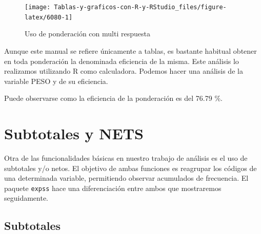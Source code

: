 \documentclass[
]{book}
\newenvironment{Shaded}{\begin{snugshade}}{\end{snugshade}}
\newcommand{\AttributeTok}[1]{\textcolor[rgb]{0.77,0.63,0.00}{#1}}
\newcommand{\ConstantTok}[1]{\textcolor[rgb]{0.00,0.00,0.00}{#1}}
\newcommand{\DecValTok}[1]{\textcolor[rgb]{0.00,0.00,0.81}{#1}}
\newcommand{\FunctionTok}[1]{\textcolor[rgb]{0.00,0.00,0.00}{#1}}
\newcommand{\NormalTok}[1]{#1}
\newcommand{\OtherTok}[1]{\textcolor[rgb]{0.56,0.35,0.01}{#1}}
\newcommand{\SpecialCharTok}[1]{\textcolor[rgb]{0.00,0.00,0.00}{#1}}
\begin{document}
\begin{figure}[H]

{\centering \texttt{[image: Tablas-y-graficos-con-R-y-RStudio\_files/figure-latex/6080-1]} 

}

\caption{Uso de ponderación con multi respuesta}\label{fig:6080}
\end{figure}

Aunque este manual se refiere únicamente a tablas, es bastante habitual obtener en toda ponderación la denominada eficiencia de la misma. Este análisis lo realizamos utilizando R como calculadora. Podemos hacer una análisis de la variable PESO y de su eficiencia.

\begin{Shaded}
\end{Shaded}

Puede observarse como la eficiencia de la ponderación es del 76.79 \%.

\hypertarget{subtotales-y-nets}{%
\section{Subtotales y NETS}\label{subtotales-y-nets}}

Otra de las funcionalidades básicas en nuestro trabajo de análisis es el uso de subtotales y/o netos. El objetivo de ambas funciones es reagrupar los códigos de una determinada variable, permitiendo observar acumulados de frecuencia. El paquete \texttt{expss} hace una diferenciación entre ambos que mostraremos seguidamente.

\hypertarget{subtotales}{%
\subsection{Subtotales}\label{subtotales}}
\end{document}
